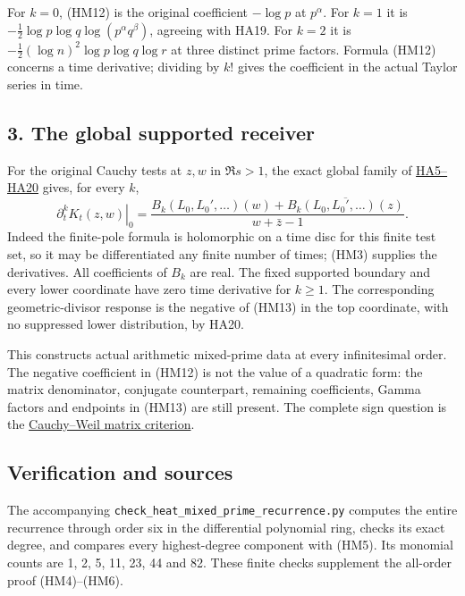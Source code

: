 \documentclass[
  10pt,
  a4paper,
]{article}
\begin{document}
For \(k=0\), (HM12) is the original coefficient \(-\log p\) at
\(p^\alpha\). For \(k=1\) it is
\(-\tfrac12\log p\log q\log(p^\alpha q^\beta)\), agreeing with HA19. For
\(k=2\) it is \(-\tfrac12(\log n)^2\log p\log q\log r\) at three
distinct prime factors. Formula (HM12) concerns a time derivative;
dividing by \(k!\) gives the coefficient in the actual Taylor series in
time.

\subsection{3. The global supported
receiver}\label{the-global-supported-receiver}

For the original Cauchy tests at \(z,w\) in \(\Re s>1\), the exact
global family of \href{HEAT_CAUCHY_ARITHMETIC_DERIVATION.md}{HA5--HA20}
gives, for every \(k\), \[
\left.\partial_t^kK_t(z,w)\right|_0
=\frac{B_k(L_0,L_0',\ldots)(w)
+\overline{B_k(L_0,L_0',\ldots)(z)}}{w+\bar z-1}.
\tag{HM13}
\] Indeed the finite-pole formula is holomorphic on a time disc for this
finite test set, so it may be differentiated any finite number of times;
(HM3) supplies the derivatives. All coefficients of \(B_k\) are real.
The fixed supported boundary and every lower coordinate have zero time
derivative for \(k\ge1\). The corresponding geometric-divisor response
is the negative of (HM13) in the top coordinate, with no suppressed
lower distribution, by HA20.

This constructs actual arithmetic mixed-prime data at every
infinitesimal order. The negative coefficient in (HM12) is not the value
of a quadratic form: the matrix denominator, conjugate counterpart,
remaining coefficients, Gamma factors and endpoints in (HM13) are still
present. The complete sign question is the
\href{CAUCHY_WEIL_POSITIVITY_CRITERION.md}{Cauchy--Weil matrix
criterion}.

\subsection{Verification and sources}\label{verification-and-sources}

The accompanying \texttt{check\_\allowbreak{}heat\_\allowbreak{}mixed\_\allowbreak{}prime\_\allowbreak{}recurrence.\allowbreak{}py}
computes the entire recurrence through order six in the differential
polynomial ring, checks its exact degree, and compares every
highest-degree component with (HM5). Its monomial counts are 1, 2, 5,
11, 23, 44 and 82. These finite checks supplement the all-order proof
(HM4)--(HM6).
\end{document}
